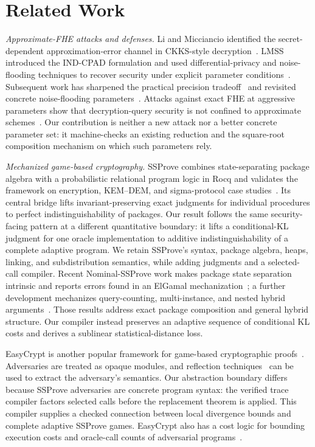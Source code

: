 \section{Related Work}
\label{sec:related-work}

\emph{Approximate-FHE attacks and defenses.} Li and Micciancio identified the secret-dependent approxi\-mation-error channel in CKKS-style decryption~\cite{lm}.
LMSS introduced the IND-CPAD formulation and used differential-privacy and noise-flooding techniques to recover security under explicit parameter conditions~\cite{lmss}.
Subsequent work has sharpened the practical precision tradeoff~\cite{costache2023precision} and revisited concrete noise-flooding parameters~\cite{bergamaschi2025revisiting}.
Attacks against exact FHE at aggressive parameters show that decryption-query security is not confined to approximate schemes~\cite{cheon2024attacks}.
Our contribution is neither a new attack nor a better concrete parameter set: it machine-checks an existing reduction and the square-root composition mechanism on which such parameters rely.

\emph{Mechanized game-based cryptography.} SSProve combines state-separating package algebra with a probabilistic relational program logic in Rocq and validates the framework on encryption, KEM--DEM, and sigma-protocol case studies~\cite{ssprove}.
Its central bridge lifts invariant-preserving exact judgments for individual procedures to perfect indistinguishability of packages.
Our result follows the same security-facing pattern at a different quantitative boundary: it lifts a conditional-KL judgment for one oracle implementation to additive indistinguishability of a complete adaptive program.
We retain SSProve's syntax, package algebra, heaps, linking, and subdistribution semantics, while adding judgments and a selected-call compiler.
Recent Nominal-SSProve work makes package state separation intrinsic and reports errors found in an ElGamal mechanization~\cite{nominal-ssprove}; a further development mechanizes query-counting, multi-instance, and nested hybrid arguments~\cite{nested-hybrids}.
Those results address exact package composition and general hybrid structure.
Our compiler instead preserves an adaptive sequence of conditional KL costs and derives a sublinear statistical-distance loss.

EasyCrypt is another popular framework for game-based cryptographic proofs~\cite{easycrypt}.
Adversaries are treated as opaque modules, and reflection techniques~\cite{reflection} can be used to extract the adversary's semantics.
Our abstraction boundary differs because SSProve adversaries are concrete program syntax: the verified trace compiler factors selected calls before the replacement theorem is applied.
This compiler supplies a checked connection between local divergence bounds and complete adaptive SSProve games.
EasyCrypt also has a cost logic for bounding execution costs and oracle-call counts of adversarial programs~\cite{easycrypt-cost}.

